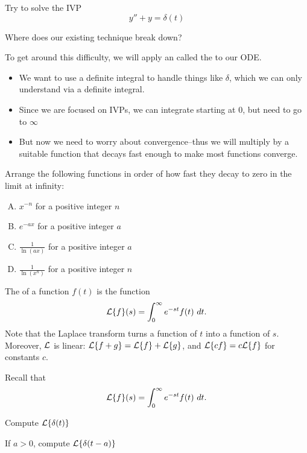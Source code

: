 \begin{applicationActivities}
\begin{activity}{10}
Try to solve the IVP 
\[y''+y=\delta(t)\]

\vfill
Where does our existing technique break down?
\end{activity}

\begin{observation}
To get around this difficulty, we will apply an  called the  to our ODE.
\vfill
\begin{itemize}
\item We want to use a definite integral to handle things like \(\delta\), which we can only understand via a definite integral.
\item Since we are focused on IVPs, we can integrate starting at \(0\), but need to go to \(\infty\)
\item But now we need to worry about convergence--thus we will multiply by a suitable function that decays fast enough to make most functions converge.
\end{itemize}
\end{observation}

\begin{activity}{5}
Arrange the following functions in order of how fast they decay to zero in the limit at infinity:
\begin{enumerate}[(A)]
\item \(x^{-n}\) for a positive integer \(n\)
\item \(e^{-ax}\) for a positive integer \(a\)
\item \(\frac{1}{\ln(ax)}\) for a positive integer \(a\)
\item \(\frac{1}{\ln(x^n)}\) for a positive integer \(n\)
\end{enumerate}
\end{activity}

\begin{definition}
The  of a function \(f(t)\) is the function
\[\mathcal{L}\{f\}(s)=\int _0 ^\infty e^{-st}f(t)\ dt.\]
\vfill
Note that the Laplace transform turns a function of \(t\) into a function of \(s\).
\vfill
Moreover, \(\mathcal{L}\) is linear: \(\mathcal{L}\{f+g\}=\mathcal{L}\{f\}+\mathcal{L}\{g\}\), and \(\mathcal{L}\{cf\}=c\mathcal{L}\{f\}\) for constants \(c\).
\end{definition}


\begin{activity}{5}
Recall that \[\mathcal{L}\{f\}(s)=\int _0 ^\infty e^{-st} f(t)\ dt.\]
\begin{subactivity}
Compute \(\mathcal{L}\{\delta(t)\}\)
\end{subactivity}
\begin{subactivity}
If \(a>0\), compute \(\mathcal{L}\{\delta(t-a)\}\)
\end{subactivity}
\end{activity}


\end{applicationActivities}
